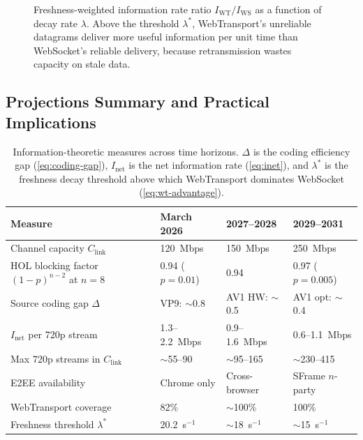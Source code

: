 \begin{figure}[ht]
\begin{tikzpicture}[>=Stealth]
\end{tikzpicture}
\caption{Freshness-weighted information rate ratio $I_{\text{WT}} / I_{\text{WS}}$
  as a function of decay rate $\lambda$. Above the threshold $\lambda^*$,
  WebTransport's unreliable datagrams deliver more useful information per
  unit time than WebSocket's reliable delivery, because retransmission
  wastes capacity on stale data.}
\label{fig:freshness}
\end{figure}

\subsection{Projections Summary and Practical Implications}

\begin{table}[ht]
\centering
\small
\renewcommand{\arraystretch}{1.4}
\begin{tabularx}{\textwidth}{lXXX}
\toprule
\textbf{Measure} & \textbf{March 2026} & \textbf{2027--2028} &
  \textbf{2029--2031} \\
\midrule
Channel capacity $C_{\text{link}}$ &
  120~Mbps &
  150~Mbps &
  250~Mbps \\
HOL blocking factor $(1\!-\!p)^{n-2}$ at $n\!=\!8$ &
  0.94 ($p\!=\!0.01$) &
  0.94 &
  0.97 ($p\!=\!0.005$) \\
Source coding gap $\Delta$ &
  VP9: $\sim$0.8 &
  AV1 HW: $\sim$0.5 &
  AV1 opt: $\sim$0.4 \\
$I_{\text{net}}$ per 720p stream &
  1.3--2.2~Mbps &
  0.9--1.6~Mbps &
  0.6--1.1~Mbps \\
Max 720p streams in $C_{\text{link}}$ &
  $\sim$55--90 &
  $\sim$95--165 &
  $\sim$230--415 \\
E2EE availability &
  Chrome only &
  Cross-browser &
  SFrame $n$-party \\
WebTransport coverage &
  82\% &
  $\sim$100\% &
  100\% \\
Freshness threshold $\lambda^*$ &
  20.2~s$^{-1}$ &
  $\sim$18~s$^{-1}$ &
  $\sim$15~s$^{-1}$ \\
\bottomrule
\end{tabularx}
\caption{Information-theoretic measures across time horizons. $\Delta$
  is the coding efficiency gap (\ref{eq:coding-gap}), $I_{\text{net}}$
  is the net information rate (\ref{eq:inet}), and $\lambda^*$ is the
  freshness decay threshold above which WebTransport dominates WebSocket
  (\ref{eq:wt-advantage}).}
\label{tab:projections}
\end{table}

